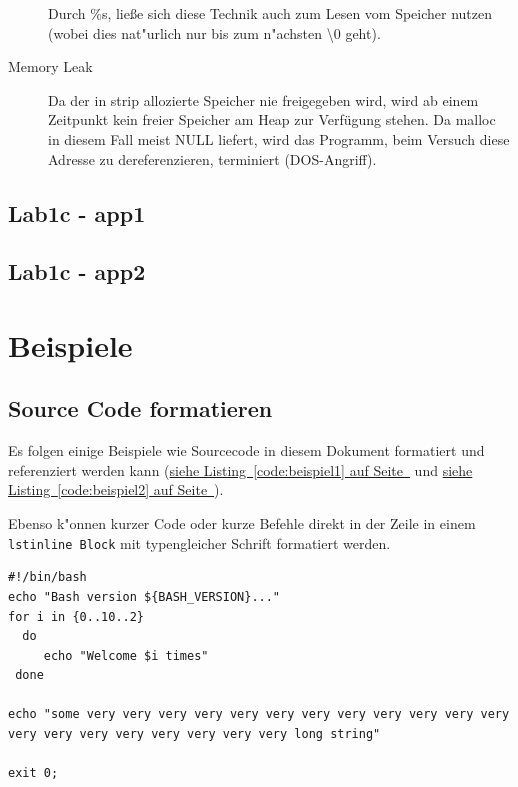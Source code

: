 \documentclass[12pt,a4paper,titlepage,oneside]{scrartcl}
\begin{document}
\begin{description}
    Durch \%s, ließe sich diese Technik auch zum Lesen vom Speicher nutzen (wobei dies nat"urlich nur bis zum n"achsten \textbackslash0 geht).
    \item[Memory Leak]
    Da der in strip allozierte Speicher nie freigegeben wird, wird ab einem Zeitpunkt kein freier Speicher am Heap zur Verfügung stehen. Da malloc in diesem Fall meist NULL liefert, wird das Programm, beim Versuch diese Adresse zu dereferenzieren, terminiert (DOS-Angriff).
\end{description}

\subsection{Lab1c - app1}

\subsection{Lab1c - app2}

\section{Beispiele}

\subsection{Source Code formatieren}
Es folgen einige Beispiele wie Sourcecode in diesem Dokument formatiert und referenziert werden kann
(\hyperref[code:beispiel1]{siehe Listing~\ref*{code:beispiel1} auf Seite~\pageref*{code:beispiel1}} und \hyperref[code:beispiel2]{siehe Listing~\ref*{code:beispiel2} auf Seite~\pageref*{code:beispiel2}}).

Ebenso k"onnen kurzer Code oder kurze Befehle direkt in der Zeile in einem \lstinline{lstinline Block} mit typengleicher Schrift formatiert werden.

%

\begin{lstlisting}[caption=Example bash script,label=code:beispiel2,style=simple]
#!/bin/bash
echo "Bash version ${BASH_VERSION}..."
for i in {0..10..2}
  do
     echo "Welcome $i times"
 done

echo "some very very very very very very very very very very very very very very very very very very very very long string"

exit 0;
\end{lstlisting}
\end{document}
